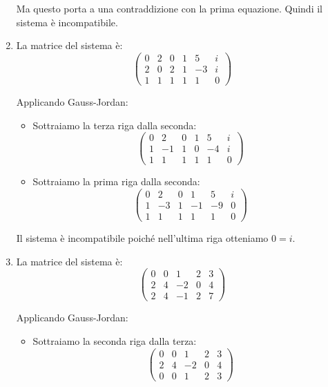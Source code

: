 \documentclass{article}
\theoremstyle{plain}
\theoremstyle{definition}
\theoremstyle{remark}
\begin{document}
\begin{enumerate}
    Ma questo porta a una contraddizione con la prima equazione. Quindi il sistema è incompatibile.
    
    \item La matrice del sistema è:
    \[
    \begin{pmatrix}
    0 & 2 & 0 & 1 & 5 & i \\
    2 & 0 & 2 & 1 & -3 & i \\
    1 & 1 & 1 & 1 & 1 & 0
    \end{pmatrix}
    \]
    
    Applicando Gauss-Jordan:
    \begin{itemize}
        \item Sottraiamo la terza riga dalla seconda:
        \[
        \begin{pmatrix}
        0 & 2 & 0 & 1 & 5 & i \\
        1 & -1 & 1 & 0 & -4 & i \\
        1 & 1 & 1 & 1 & 1 & 0
        \end{pmatrix}
        \]
        
        \item Sottraiamo la prima riga dalla seconda:
        \[
        \begin{pmatrix}
        0 & 2 & 0 & 1 & 5 & i \\
        1 & -3 & 1 & -1 & -9 & 0 \\
        1 & 1 & 1 & 1 & 1 & 0
        \end{pmatrix}
        \]
    \end{itemize}
    
    Il sistema è incompatibile poiché nell'ultima riga otteniamo $0 = i$.
    
    \item La matrice del sistema è:
    \[
    \begin{pmatrix}
    0 & 0 & 1 & 2 & 3 \\
    2 & 4 & -2 & 0 & 4 \\
    2 & 4 & -1 & 2 & 7
    \end{pmatrix}
    \]
    
    Applicando Gauss-Jordan:
    \begin{itemize}
        \item Sottraiamo la seconda riga dalla terza:
        \[
        \begin{pmatrix}
        0 & 0 & 1 & 2 & 3 \\
        2 & 4 & -2 & 0 & 4 \\
        0 & 0 & 1 & 2 & 3
        \end{pmatrix}
        \]
    \end{itemize}
    

\end{enumerate}
\end{document}
